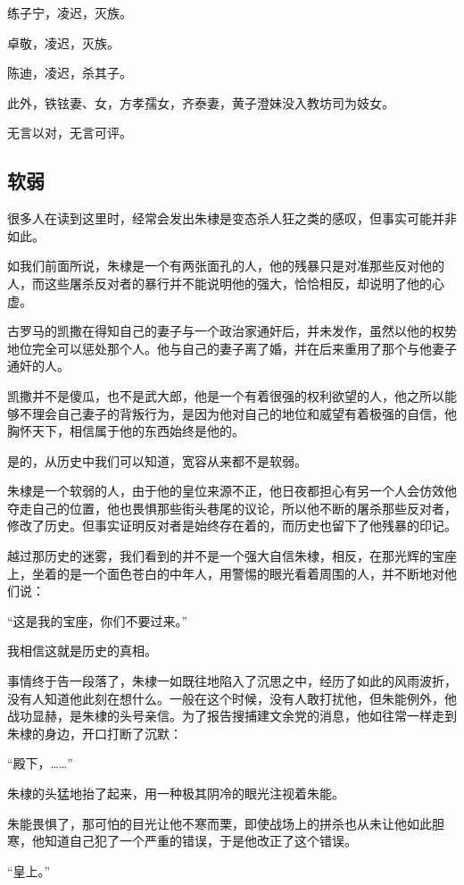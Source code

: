 \begin{multicols}{\theparacolNo}
		练子宁，凌迟，灭族。

		卓敬，凌迟，灭族。

		陈迪，凌迟，杀其子。

		此外，铁铉妻、女，方孝孺女，齐泰妻，黄子澄妹没入教坊司为妓女。

		无言以对，无言可评。

		\subsection{软弱}
		很多人在读到这里时，经常会发出朱棣是变态杀人狂之类的感叹，但事实可能并非如此。

		如我们前面所说，朱棣是一个有两张面孔的人，他的残暴只是对准那些反对他的人，而这些屠杀反对者的暴行并不能说明他的强大，恰恰相反，却说明了他的心虚。

		古罗马的凯撒在得知自己的妻子与一个政治家通奸后，并未发作，虽然以他的权势地位完全可以惩处那个人。他与自己的妻子离了婚，并在后来重用了那个与他妻子通奸的人。

		凯撒并不是傻瓜，也不是武大郎，他是一个有着很强的权利欲望的人，他之所以能够不理会自己妻子的背叛行为，是因为他对自己的地位和威望有着极强的自信，他胸怀天下，相信属于他的东西始终是他的。

		是的，从历史中我们可以知道，宽容从来都不是软弱。

		朱棣是一个软弱的人，由于他的皇位来源不正，他日夜都担心有另一个人会仿效他夺走自己的位置，他也畏惧那些街头巷尾的议论，所以他不断的屠杀那些反对者，修改了历史。但事实证明反对者是始终存在着的，而历史也留下了他残暴的印记。

		越过那历史的迷雾，我们看到的并不是一个强大自信朱棣，相反，在那光辉的宝座上，坐着的是一个面色苍白的中年人，用警惕的眼光看着周围的人，并不断地对他们说：

		“这是我的宝座，你们不要过来。”

		我相信这就是历史的真相。

		事情终于告一段落了，朱棣一如既往地陷入了沉思之中，经历了如此的风雨波折，没有人知道他此刻在想什么。一般在这个时候，没有人敢打扰他，但朱能例外，他战功显赫，是朱棣的头号亲信。为了报告搜捕建文余党的消息，他如往常一样走到朱棣的身边，开口打断了沉默：

		“殿下，……”

		朱棣的头猛地抬了起来，用一种极其阴冷的眼光注视着朱能。

		朱能畏惧了，那可怕的目光让他不寒而栗，即使战场上的拼杀也从未让他如此胆寒，他知道自己犯了一个严重的错误，于是他改正了这个错误。

		“皇上。”


\end{multicols}
